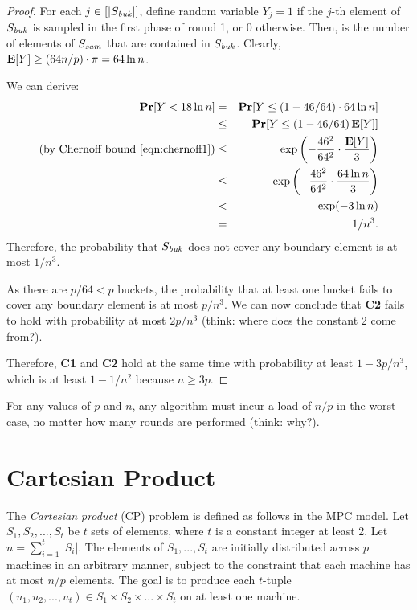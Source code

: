 \begin{proof}
	\vgap

	For each $j \in [|S_\mit{buk}|]$, define random variable $Y_j = 1$ if the $j$-th element of $S_\mit{buk}$ is sampled in the first phase of round 1, or 0 otherwise. Then,
	is the number of elements of $S_\mit{sam}$ that are contained in $S_\mit{buk}$. Clearly, $\expt[Y] \ge (64n / p) \cdot \pi = 64 \ln n$.

	\vgap

	We can derive:
	\begin{eqnarray}
		\Pr[Y < 18 \ln n] &=& \Pr[Y \le (1 - 46/64) \cdot 64 \ln n] \nn \\
		&\le& \Pr[Y \le (1 - 46/64)\expt[Y]] \nn \\
		\textrm{(by Chernoff bound \eqref{eqn:chernoff1})} &\le& \exp\left(- \fr{46^2}{64^2} \cdot \fr{\expt[Y]}{3}\right) \nn \\
		&\le& \exp\left(- \fr{46^2}{64^2} \cdot \fr{64 \ln n}{3}\right) \nn \\
		&<& \exp(-3 \ln n) \nn \\
		&=& 1/n^3. \nn
	\end{eqnarray}
	Therefore, the probability that $S_\mit{buk}$ does not cover any boundary element is at most $1/n^3$.

	\vgap

	As there are $p/64 < p$ buckets, the probability that at least one bucket fails to cover any boundary element is at most $p/n^3$. We can now conclude that {\bf C2} fails to hold with probability at most $2p/n^3$ (think: where does the constant 2 come from?).

	\vgap

	Therefore, {\bf C1} and {\bf C2} hold at the same time with probability at least $1 - 3p/n^3$, which is at least $1 - 1/n^2$ because $n \ge 3p$.
\end{proof}

 For any values of $p$ and $n$, any algorithm must incur a load of $n/p$ in the worst case, no matter how many rounds are performed (think: why?).

\section{Cartesian Product} \label{sec:cp}

The {\em Cartesian product} (CP) problem is defined as follows in the MPC model. Let $S_1, S_2, ..., S_t$ be $t$ sets of elements, where $t$ is a constant integer at least 2. Let $n = \sum_{i=1}^t |S_i|$. The elements of $S_1, ..., S_t$ are initially distributed across $p$ machines in an arbitrary manner, subject to the constraint that each machine has at most $n/p$ elements. The goal is to produce each $t$-tuple $(u_1, u_2, ..., u_t) \in S_1 \times S_2 \times ... \times S_t$ on at least one machine.

